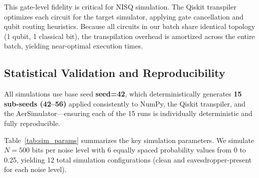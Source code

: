 \documentclass[conference]{IEEEtran}
\begin{document}
This gate-level fidelity is critical for NISQ simulation. The Qiskit transpiler optimizes each circuit for the target simulator, applying gate cancellation and qubit routing heuristics. Because all circuits in our batch share identical topology (1 qubit, 1 classical bit), the transpilation overhead is amortized across the entire batch, yielding near-optimal execution times.

\subsection{Statistical Validation and Reproducibility}
All simulations use base seed \textbf{seed=42}, which deterministically generates \textbf{15 sub-seeds (42--56)} applied consistently to NumPy, the Qiskit transpiler, and the AerSimulator---ensuring each of the 15 runs is individually deterministic and fully reproducible. %

Table~\ref{tab:sim_params} summarizes the key simulation parameters. We simulate $N=500$ bits per noise level with 6 equally spaced probability values from 0 to 0.25, yielding 12 total simulation configurations (clean and eavesdropper-present for each noise level).

\begin{table}[htbp]
\caption{Simulation Parameters for B92 Noise Analysis}
\label{tab:sim_params}
\centering
\small
{}
\end{table}
\end{document}
